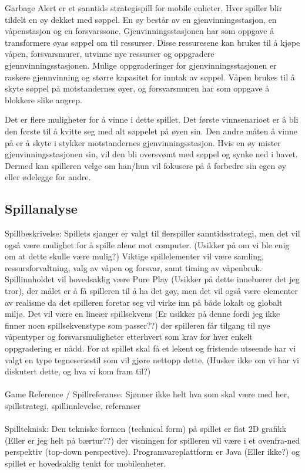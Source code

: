 Garbage Alert er et sanntids strategispill for mobile enheter. Hver
spiller blir tildelt en øy dekket med søppel. En øy består av en
gjenvinningsstasjon, en våpenstasjon og en forsvarssone.
Gjenvinningsstasjonen har som oppgave å transformere øyas søppel om til
ressurser. Disse ressuresene kan brukes til å kjøpe våpen,
forsvarsmurer, utvinne nye ressurser og oppgradere
gjennvinningsstasjonen. Mulige oppgraderinger for gjenvinningsstasjonen
er raskere gjennvinning og større kapasitet for inntak av søppel. Våpen
brukes til å skyte søppel på motstandernes øyer, og forsvarsmuren har
som oppgave å blokkere slike angrep. 

Det er flere muligheter for å vinne i dette spillet. Det første
vinnsenarioet er å bli den første til å kvitte seg med alt søppelet på
øyen sin. Den andre måten å vinne på er å skyte i stykker motstandernes
gjenvinningsstasjon. Hvis en øy mister gjenvinningsstasjonen sin, vil
den bli oversvømt med søppel og synke ned i havet. Dermed kan spilleren
velge om han/hun vil fokusere på å forbedre sin egen øy eller ødelegge
for andre. 

\subsection{Spillanalyse}

Spillbeskrivelse: Spillets sjanger er valgt til flerspiller sanntidsstrategi, men det vil også være mulighet for å spille alene mot computer. (Usikker på om vi ble enig om at dette skulle være mulig?) Viktige spillelementer vil være samling, ressursforvaltning, valg av våpen og forsvar, samt timing av våpenbruk. Spillinnholdet vil hovedsaklig være Pure Play (Usikker på dette innebærer det jeg tror), der målet er å få spilleren til å ha det gøy, men det vil også være elementer av realisme da det spilleren foretar seg vil virke inn på både lokalt og globalt miljø. Det vil være en lineær spillsekvens (Er usikker på denne fordi jeg ikke finner noen  spillsekvenstype som passer??) der spilleren får tilgang til nye våpentyper og forsvarsmuligheter etterhvert som krav for hver enkelt oppgradering er nådd. For at spillet skal få et lekent og fristende utseende har vi valgt en type tegneseriestil som vil gjøre nettopp dette. (Husker ikke om vi har vi diskutert dette, og hva vi kom fram til?)\\ 
\\
Game Reference / Spillreferanse: Sjønner ikke helt hva som skal være med her, spillstrategi, spillinnlevelse, referanser\\
\\
Spillteknisk: Den tekniske formen (technical form) på spillet er flat 2D grafikk (Eller er jeg helt på bærtur??) der visningen for spilleren vil være i et ovenfra-ned perspektiv (top-down perspective). Programvareplattform er Java (Eller ikke?) og spillet er hovedsaklig tenkt for mobilenheter.


